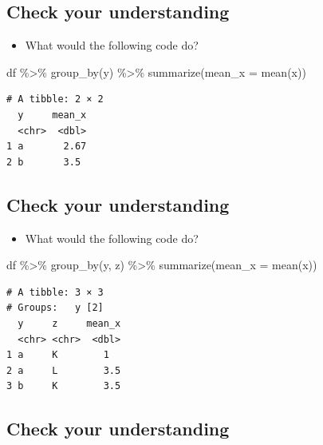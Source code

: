 \documentclass[
  letterpaper,
  DIV=11,
  numbers=noendperiod]{scrartcl}
\newenvironment{Shaded}{\begin{snugshade}}{\end{snugshade}}
\newcommand{\AttributeTok}[1]{\textcolor[rgb]{0.40,0.45,0.13}{#1}}
\newcommand{\FunctionTok}[1]{\textcolor[rgb]{0.28,0.35,0.67}{#1}}
\newcommand{\NormalTok}[1]{\textcolor[rgb]{0.00,0.23,0.31}{#1}}
\newcommand{\SpecialCharTok}[1]{\textcolor[rgb]{0.37,0.37,0.37}{#1}}
\providecommand{\tightlist}{%
  \setlength{\itemsep}{0pt}\setlength{\parskip}{0pt}}
\begin{document}
\subsection{Check your understanding}\label{check-your-understanding-2}

\begin{itemize}
\tightlist
\item
  What would the following code do?
\end{itemize}

\begin{Shaded}
\begin{Highlighting}[]
\NormalTok{df }\SpecialCharTok{\%\textgreater{}\%}
  \FunctionTok{group\_by}\NormalTok{(y) }\SpecialCharTok{\%\textgreater{}\%}
  \FunctionTok{summarize}\NormalTok{(}\AttributeTok{mean\_x =} \FunctionTok{mean}\NormalTok{(x))}
\end{Highlighting}
\end{Shaded}

\begin{verbatim}
# A tibble: 2 × 2
  y     mean_x
  <chr>  <dbl>
1 a       2.67
2 b       3.5
\end{verbatim}

\subsection{Check your understanding}\label{check-your-understanding-3}

\begin{itemize}
\tightlist
\item
  What would the following code do?
\end{itemize}

\begin{Shaded}
\begin{Highlighting}[]
\NormalTok{df }\SpecialCharTok{\%\textgreater{}\%}
  \FunctionTok{group\_by}\NormalTok{(y, z) }\SpecialCharTok{\%\textgreater{}\%}
  \FunctionTok{summarize}\NormalTok{(}\AttributeTok{mean\_x =} \FunctionTok{mean}\NormalTok{(x))}
\end{Highlighting}
\end{Shaded}

\begin{verbatim}
# A tibble: 3 × 3
# Groups:   y [2]
  y     z     mean_x
  <chr> <chr>  <dbl>
1 a     K        1
2 a     L        3.5
3 b     K        3.5
\end{verbatim}

\subsection{Check your understanding}\label{check-your-understanding-4}
\end{document}
